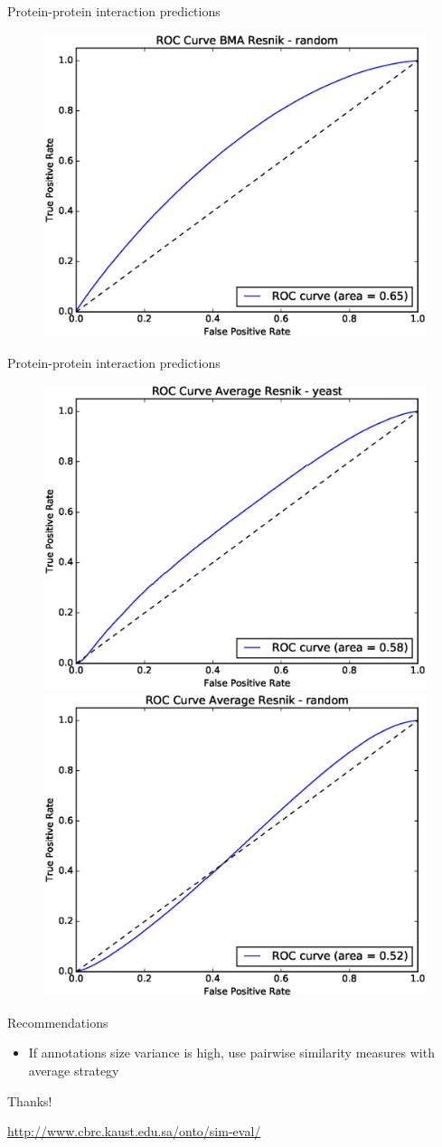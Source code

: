 \documentclass{beamer}
\begin{document}
\begin{frame}{Protein-protein interaction predictions}
\begin{figure}
\includegraphics[width=0.5\linewidth, height=0.4\textheight]{ppi/figure_bma_resnik_random.eps}
\end{figure}
\end{frame}


\begin{frame}{Protein-protein interaction predictions}
\begin{figure}
\includegraphics[width=0.5\linewidth, height=0.5\textheight]{ppi/figure_average_resnik_yeast.eps}
\includegraphics[width=0.5\linewidth, height=0.5\textheight]{ppi/figure_average_resnik_random.eps}
\end{figure}
\end{frame}


\begin{frame}{Recommendations}
\begin{itemize}
\item If annotations size variance is high, use pairwise similarity measures with average strategy
\end{itemize}
\end{frame}


\begin{frame}
\Huge{\centerline{Thanks!}}
\small{\centerline{\url{http://www.cbrc.kaust.edu.sa/onto/sim-eval/}}}
\end{frame}

\end{document}
